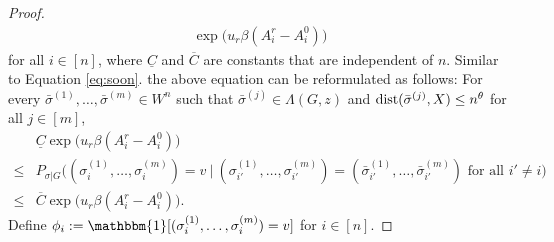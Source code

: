 \documentclass{article}
\begin{document}
\begin{proof}
\begin{align*}
	\exp\big(u_r \beta (A^r_i-A^0_i) \big)
	\end{align*}
	for all $i\in[n]$, where $\underline{C}$ and $\overline{C}$ are constants that are independent of $n$.
	Similar to Equation \eqref{eq:soon}. the above equation can be reformulated as follows:
	For every $\bar{\sigma}^{(1)},\dots,\bar{\sigma}^{(m)}\in W^n$ such that $\bar{\sigma}^{(j)}\in  \Lambda(G, z)$
	and $\operatorname{dist}(\bar{\sigma}^{(j)}, X) \le n^\theta$
	for all $j\in[m]$,
	\begin{equation} \label{eq:s56}
	\begin{aligned}
	& \underline{C}
	\exp\big( u_r  \beta (A^r_i-A^0_i) \big) \\
	\le
	& P_{\sigma|G} \big( (\sigma_i^{(1)},\dots,\sigma_i^{(m)})=v ~\big|~ (\sigma_{i'}^{(1)},\dots,\sigma_{i'}^{(m)})= (\bar{\sigma}_{i'}^{(1)},\dots,\bar{\sigma}_{i'}^{(m)}) \text{~for all~} i'\neq i \big) \\
	\le & \overline{C}
	\exp\big(u_r  \beta (A^r_i-A^0_i) \big).
	\end{aligned}
	\end{equation}
	Define 
	$\phi_i := \mathbbm{1}[(\sigma_i^{(1)},\dots,\sigma_i^{(m)})=v]$ for $i\in[n]$.


\end{proof}
\end{document}
